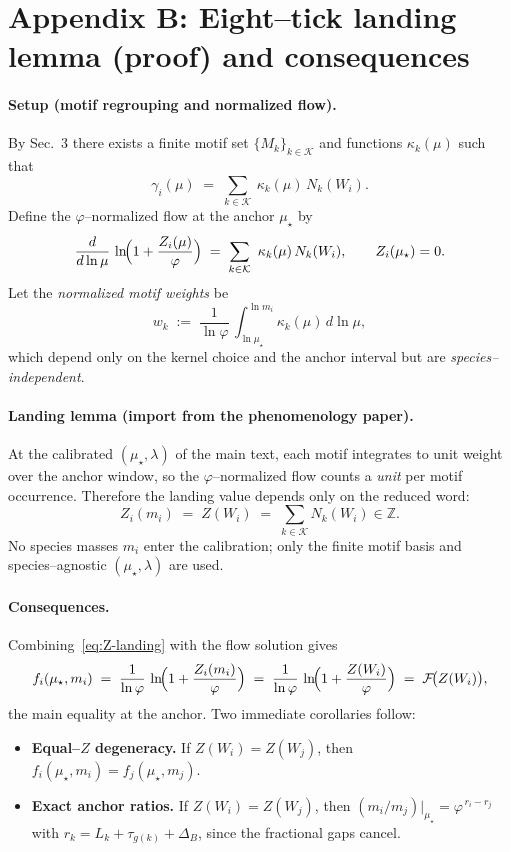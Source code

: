 \documentclass[epjc3]{svjour3}
\begin{document}
\section*{Appendix B: Eight–tick landing lemma (proof) and consequences}

\paragraph{Setup (motif regrouping and normalized flow).}
By Sec.~3 there exists a finite motif set $\{M_k\}_{k\in\mathcal{K}}$ and functions $\kappa_k(\mu)$ such that
\begin{equation}
  \gamma_i(\mu) \;=\; \sum_{k\in\mathcal{K}}\ \kappa_k(\mu)\,N_k(W_i).
  \label{eq:B-gamma-regroup}
\end{equation}
Define the $\varphi$–normalized flow at the anchor $\mu_\star$ by
\begin{equation}
  \frac{d}{d\ln\mu}\,\ln\!\Bigl(1+\frac{Z_i(\mu)}{\varphi}\Bigr)
  \;=\; \sum_{k\in\mathcal{K}}\ \kappa_k(\mu)\,N_k(W_i),
  \qquad Z_i(\mu_\star)=0.
  \label{eq:B-phiNR}
\end{equation}
Let the \emph{normalized motif weights} be
\[
  w_k \;:=\; \frac{1}{\ln\varphi}\,\int_{\ln\mu_\star}^{\ln m_i}\kappa_k(\mu)\,d\ln\mu,
\]
which depend only on the kernel choice and the anchor interval but are \emph{species–independent}.

\paragraph{Landing lemma (import from the phenomenology paper).}
At the calibrated $(\mu_\star,\lambda)$ of the main text, each motif
integrates to unit weight over the anchor window, so the $\varphi$–normalized
flow counts a \emph{unit} per motif occurrence. Therefore the landing value
depends only on the reduced word:
\[
  Z_i(m_i)\;=\;Z(W_i)\;=\;\sum_{k\in\mathcal{K}} N_k(W_i)\in\mathbb{Z}.
\]
No species masses $m_i$ enter the calibration; only the finite motif basis and
species–agnostic $(\mu_\star,\lambda)$ are used.

\paragraph{Consequences.}
Combining~\eqref{eq:Z-landing} with the flow solution gives
\[
  f_i(\mu_\star,m_i) \;=\; \frac{1}{\ln\varphi}\,\ln\!\Bigl(1+\frac{Z_i(m_i)}{\varphi}\Bigr)
  \;=\; \frac{1}{\ln\varphi}\,\ln\!\Bigl(1+\frac{Z(W_i)}{\varphi}\Bigr)
  \;=\; \mathcal F\!\bigl(Z(W_i)\bigr),
\]
the main equality at the anchor. Two immediate corollaries follow:
\begin{itemize}
  \item \textbf{Equal–$Z$ degeneracy.} If $Z(W_i)=Z(W_j)$, then $f_i(\mu_\star,m_i)=f_j(\mu_\star,m_j)$.
  \item \textbf{Exact anchor ratios.} If $Z(W_i)=Z(W_j)$, then
  $
    (m_i/m_j)|_{\mu_\star}=\varphi^{\,r_i-r_j}
  $
  with $r_k=L_k+\tau_{g(k)}+\Delta_B$, since the fractional gaps cancel.
\end{itemize}
\end{document}
